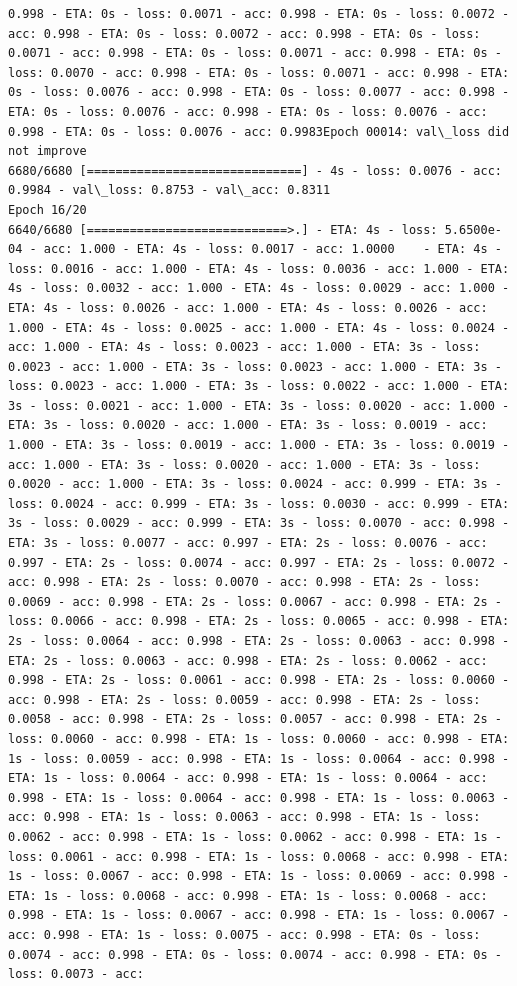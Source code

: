 \documentclass[11pt]{article}
\begin{document}
\begin{Verbatim}[commandchars=\\\{\}]
0.998 - ETA: 0s - loss: 0.0071 - acc: 0.998 - ETA: 0s - loss: 0.0072 - acc: 0.998 - ETA: 0s - loss: 0.0072 - acc: 0.998 - ETA: 0s - loss: 0.0071 - acc: 0.998 - ETA: 0s - loss: 0.0071 - acc: 0.998 - ETA: 0s - loss: 0.0070 - acc: 0.998 - ETA: 0s - loss: 0.0071 - acc: 0.998 - ETA: 0s - loss: 0.0076 - acc: 0.998 - ETA: 0s - loss: 0.0077 - acc: 0.998 - ETA: 0s - loss: 0.0076 - acc: 0.998 - ETA: 0s - loss: 0.0076 - acc: 0.998 - ETA: 0s - loss: 0.0076 - acc: 0.9983Epoch 00014: val\_loss did not improve
6680/6680 [==============================] - 4s - loss: 0.0076 - acc: 0.9984 - val\_loss: 0.8753 - val\_acc: 0.8311
Epoch 16/20
6640/6680 [============================>.] - ETA: 4s - loss: 5.6500e-04 - acc: 1.000 - ETA: 4s - loss: 0.0017 - acc: 1.0000    - ETA: 4s - loss: 0.0016 - acc: 1.000 - ETA: 4s - loss: 0.0036 - acc: 1.000 - ETA: 4s - loss: 0.0032 - acc: 1.000 - ETA: 4s - loss: 0.0029 - acc: 1.000 - ETA: 4s - loss: 0.0026 - acc: 1.000 - ETA: 4s - loss: 0.0026 - acc: 1.000 - ETA: 4s - loss: 0.0025 - acc: 1.000 - ETA: 4s - loss: 0.0024 - acc: 1.000 - ETA: 4s - loss: 0.0023 - acc: 1.000 - ETA: 3s - loss: 0.0023 - acc: 1.000 - ETA: 3s - loss: 0.0023 - acc: 1.000 - ETA: 3s - loss: 0.0023 - acc: 1.000 - ETA: 3s - loss: 0.0022 - acc: 1.000 - ETA: 3s - loss: 0.0021 - acc: 1.000 - ETA: 3s - loss: 0.0020 - acc: 1.000 - ETA: 3s - loss: 0.0020 - acc: 1.000 - ETA: 3s - loss: 0.0019 - acc: 1.000 - ETA: 3s - loss: 0.0019 - acc: 1.000 - ETA: 3s - loss: 0.0019 - acc: 1.000 - ETA: 3s - loss: 0.0020 - acc: 1.000 - ETA: 3s - loss: 0.0020 - acc: 1.000 - ETA: 3s - loss: 0.0024 - acc: 0.999 - ETA: 3s - loss: 0.0024 - acc: 0.999 - ETA: 3s - loss: 0.0030 - acc: 0.999 - ETA: 3s - loss: 0.0029 - acc: 0.999 - ETA: 3s - loss: 0.0070 - acc: 0.998 - ETA: 3s - loss: 0.0077 - acc: 0.997 - ETA: 2s - loss: 0.0076 - acc: 0.997 - ETA: 2s - loss: 0.0074 - acc: 0.997 - ETA: 2s - loss: 0.0072 - acc: 0.998 - ETA: 2s - loss: 0.0070 - acc: 0.998 - ETA: 2s - loss: 0.0069 - acc: 0.998 - ETA: 2s - loss: 0.0067 - acc: 0.998 - ETA: 2s - loss: 0.0066 - acc: 0.998 - ETA: 2s - loss: 0.0065 - acc: 0.998 - ETA: 2s - loss: 0.0064 - acc: 0.998 - ETA: 2s - loss: 0.0063 - acc: 0.998 - ETA: 2s - loss: 0.0063 - acc: 0.998 - ETA: 2s - loss: 0.0062 - acc: 0.998 - ETA: 2s - loss: 0.0061 - acc: 0.998 - ETA: 2s - loss: 0.0060 - acc: 0.998 - ETA: 2s - loss: 0.0059 - acc: 0.998 - ETA: 2s - loss: 0.0058 - acc: 0.998 - ETA: 2s - loss: 0.0057 - acc: 0.998 - ETA: 2s - loss: 0.0060 - acc: 0.998 - ETA: 1s - loss: 0.0060 - acc: 0.998 - ETA: 1s - loss: 0.0059 - acc: 0.998 - ETA: 1s - loss: 0.0064 - acc: 0.998 - ETA: 1s - loss: 0.0064 - acc: 0.998 - ETA: 1s - loss: 0.0064 - acc: 0.998 - ETA: 1s - loss: 0.0064 - acc: 0.998 - ETA: 1s - loss: 0.0063 - acc: 0.998 - ETA: 1s - loss: 0.0063 - acc: 0.998 - ETA: 1s - loss: 0.0062 - acc: 0.998 - ETA: 1s - loss: 0.0062 - acc: 0.998 - ETA: 1s - loss: 0.0061 - acc: 0.998 - ETA: 1s - loss: 0.0068 - acc: 0.998 - ETA: 1s - loss: 0.0067 - acc: 0.998 - ETA: 1s - loss: 0.0069 - acc: 0.998 - ETA: 1s - loss: 0.0068 - acc: 0.998 - ETA: 1s - loss: 0.0068 - acc: 0.998 - ETA: 1s - loss: 0.0067 - acc: 0.998 - ETA: 1s - loss: 0.0067 - acc: 0.998 - ETA: 1s - loss: 0.0075 - acc: 0.998 - ETA: 0s - loss: 0.0074 - acc: 0.998 - ETA: 0s - loss: 0.0074 - acc: 0.998 - ETA: 0s - loss: 0.0073 - acc: 
\end{Verbatim}
\end{document}
